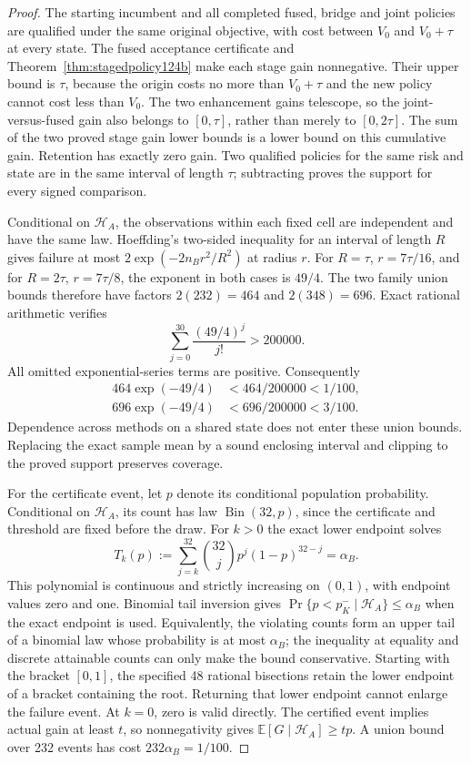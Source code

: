 \begin{proof}
The starting incumbent and all completed fused, bridge and joint policies
are qualified under the same original objective, with cost between
$V_0$ and $V_0+\tau$ at every state. The fused acceptance certificate
and Theorem~\ref{thm:stagedpolicy124b} make each stage gain nonnegative.
Their upper bound is $\tau$, because the origin costs no more than
$V_0+\tau$ and the new policy cannot cost less than $V_0$.
The two enhancement gains telescope, so the joint-versus-fused gain
also belongs to $[0,\tau]$, rather than merely to $[0,2\tau]$.
The sum of the two proved stage gain lower bounds is a lower bound
on this cumulative gain. Retention has exactly zero gain. Two qualified
policies for the same risk and state are in the same interval of length
$\tau$; subtracting proves the support for every signed comparison.

Conditional on $\mathcal H_A$, the observations within each fixed cell
are independent and have the same law. Hoeffding's two-sided inequality
for an interval of length $R$ gives failure at most
$2\exp(-2n_B r^2/R^2)$ at radius $r$. For
$R=\tau$, $r=7\tau/16$, and for $R=2\tau$,
$r=7\tau/8$, the exponent in both cases is $49/4$.
The two family union bounds therefore have factors $2(232)=464$
and $2(348)=696$. Exact rational arithmetic verifies
\begin{equation}\label{eq:exponentialcheck124b}
 \sum_{j=0}^{30}\frac{(49/4)^j}{j!}>200000.
\end{equation}
All omitted exponential-series terms are positive. Consequently
\begin{align*}
 464\exp(-49/4)&<464/200000<1/100,\\
 696\exp(-49/4)&<696/200000<3/100.
\end{align*}
Dependence across methods
on a shared state does not enter these union bounds. Replacing the exact
sample mean by a sound enclosing interval and clipping to the proved
support preserves coverage.

For the certificate event, let $p$ denote its conditional population
probability. Conditional on $\mathcal H_A$, its count has law
$\operatorname{Bin}(32,p)$, since the certificate and threshold are fixed
before the draw. For $k>0$ the exact lower endpoint solves
\[
 T_k(p):=\sum_{j=k}^{32}\binom{32}{j}p^j(1-p)^{32-j}
             =\alpha_B.
\]
This polynomial is continuous and strictly increasing on $(0,1)$,
with endpoint values zero and one. Binomial tail inversion gives
$\Pr\{p<p^-_K\mid\mathcal H_A\}\le\alpha_B$ when the exact
endpoint is used. Equivalently, the violating counts form an upper
tail of a binomial law whose probability is at most $\alpha_B$;
the inequality at equality and discrete attainable counts can only
make the bound conservative. Starting with the bracket $[0,1]$, the
specified 48 rational bisections retain the lower endpoint of a bracket
containing the root. Returning that lower endpoint cannot enlarge the
failure event. At $k=0$, zero is valid directly. The certified event
implies actual gain at least $t$, so nonnegativity gives
$\mathbb E[G\mid\mathcal H_A]\ge tp$. A union bound over 232
events has cost $232\alpha_B=1/100$.


\end{proof}
